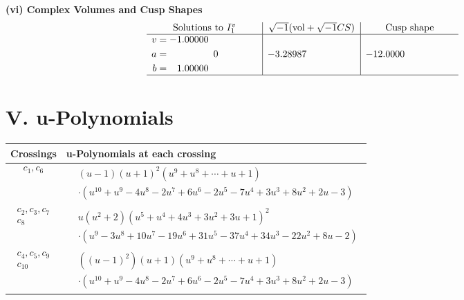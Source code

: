 \documentclass[1p]{elsarticle_modified}
\theoremstyle{definition}
\newcommand{\I}{\sqrt{-1}}
\begin{document}
\newpage\flushleft \textbf{(vi) Complex Volumes and Cusp Shapes}
$$\begin{array}{c|c|c}  
\text{Solutions to }I^v_{1}& \I (\text{vol} + \sqrt{-1}CS) & \text{Cusp shape}\\
 \hline 
\begin{aligned}
v &= -1.00000\phantom{ +0.000000I} \\
a &= \phantom{-0.000000 } 0 \\
b &= \phantom{-}1.00000\phantom{ +0.000000I}\end{aligned}
 & -3.28987\phantom{ +0.000000I} & -12.0000\phantom{ +0.000000I}\\
 \hline 
 \end{array}$$\newpage
\newpage\renewcommand{\arraystretch}{1}
\centering \section*{ V. u-Polynomials}
\begin{tabular}{m{50pt}|m{274pt}}
Crossings & \hspace{64pt}u-Polynomials at each crossing \\
\hline $$\begin{aligned}c_{1},c_{6}\end{aligned}$$&$\begin{aligned}
&(u-1)(u+1)^2(u^9+u^8+\cdots+u+1)\\
&\cdot(u^{10}+u^9-4 u^8-2 u^7+6 u^6-2 u^5-7 u^4+3 u^3+8 u^2+2 u-3)
\end{aligned}$\\
\hline $$\begin{aligned}c_{2},c_{3},c_{7}\\c_{8}\end{aligned}$$&$\begin{aligned}
&u(u^2+2)(u^5+u^4+4 u^3+3 u^2+3 u+1)^2\\
&\cdot(u^9-3 u^8+10 u^7-19 u^6+31 u^5-37 u^4+34 u^3-22 u^2+8 u-2)
\end{aligned}$\\
\hline $$\begin{aligned}c_{4},c_{5},c_{9}\\c_{10}\end{aligned}$$&$\begin{aligned}
&((u-1)^2)(u+1)(u^9+u^8+\cdots+u+1)\\
&\cdot(u^{10}+u^9-4 u^8-2 u^7+6 u^6-2 u^5-7 u^4+3 u^3+8 u^2+2 u-3)
\end{aligned}$\\
\hline
\end{tabular}\newpage\renewcommand{\arraystretch}{1}
\end{document}
